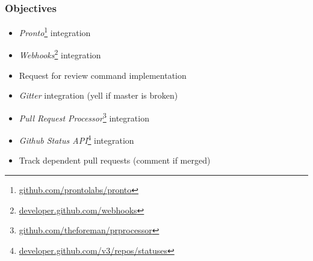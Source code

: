 \documentclass[10pt,xcolor=pdflatex]{beamer}
\begin{document}
\begin{frame}\frametitle{Objectives}
    \begin{itemize}
        \item \textit{Pronto}\footnote{\color{cyan}\href{https://github.com/prontolabs/pronto}{github.com/prontolabs/pronto}} integration\\[0.5em]
        \item \textit{Webhooks}\footnote{\color{cyan}\href{https://developer.github.com/webhooks}{developer.github.com/webhooks}} integration\\[0.5em]
        \item Request for review command implementation\\[0.5em]
        \item \textit{Gitter} integration (yell if master is broken)\\[0.5em]
        \item \textit{Pull Request Processor}\footnote{\color{cyan}\href{https://github.com/theforeman/prprocessor}{github.com/theforeman/prprocessor}} integration\\[0.5em]
        \item \textit{Github Status API}\footnote{\color{cyan}\href{https://developer.github.com/v3/repos/statuses}{developer.github.com/v3/repos/statuses}} integration\\[0.5em]
        \item Track dependent pull requests (comment if merged)
    \end{itemize}
\end{frame}

\end{document}
